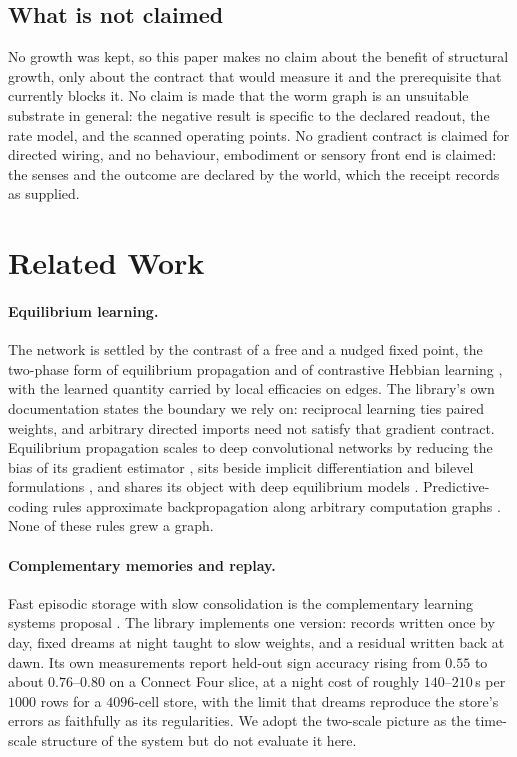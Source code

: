 \documentclass[11pt]{article}
\theoremstyle{remark}
\begin{document}
\subsection{What is not claimed}

No growth was kept, so this paper makes no claim about the benefit of structural growth, only about
the contract that would measure it and the prerequisite that currently blocks it. No claim is made
that the worm graph is an unsuitable substrate in general: the negative result is specific to the
declared readout, the rate model, and the scanned operating points. No gradient contract is claimed
for directed wiring, and no behaviour, embodiment or sensory front end is claimed: the senses and
the outcome are declared by the world, which the receipt records as supplied.

\section{Related Work}

\paragraph{Equilibrium learning.}
The network is settled by the contrast of a free and a nudged fixed point, the two-phase form of
equilibrium propagation \cite{scellier2017} and of contrastive Hebbian learning
\cite{movellan1991}, with the learned quantity carried by local efficacies on edges. The
library's own documentation states the boundary we rely on: reciprocal learning ties paired
weights, and arbitrary directed imports need not satisfy that gradient contract. Equilibrium
propagation scales to deep convolutional networks by reducing the bias of its gradient estimator
\cite{laborieux2021}, sits beside implicit differentiation and bilevel formulations
\cite{zucchet2022}, and shares its object with deep equilibrium models \cite{bai2019}.
Predictive-coding rules approximate backpropagation along arbitrary computation graphs
\cite{millidge2022,song2020}. None of these rules grew a graph.

\paragraph{Complementary memories and replay.}
Fast episodic storage with slow consolidation is the complementary learning systems proposal
\cite{mcclelland1995}. The library implements one version: records written once by day, fixed
dreams at night taught to slow weights, and a residual written back at dawn. Its own measurements
report held-out sign accuracy rising from $0.55$ to about $0.76$--$0.80$ on a Connect Four slice,
at a night cost of roughly $140$--$210$\,s per $1000$ rows for a $4096$-cell store, with the limit
that dreams reproduce the store's errors as faithfully as its regularities. We adopt the two-scale
picture as the time-scale structure of the system but do not evaluate it here.
\end{document}
